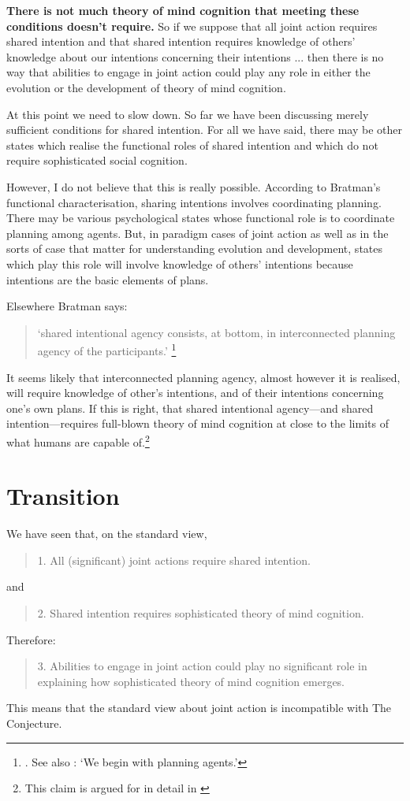 \documentclass[12pt,a4paper]{extarticle}
\begin{document}
\textbf{There is not much theory of mind cognition that meeting these conditions doesn't require.}  
So if we suppose that all joint action requires shared intention and that shared intention requires knowledge of others' knowledge about our intentions concerning their intentions ... then there is no way that abilities to engage in joint action could play any role in either the evolution or the development of theory of mind cognition.

At this point we need to slow down.
So far we have been discussing merely sufficient conditions for shared intention.
For all we have said, there may be other states which realise the functional roles of shared intention and which do not require sophisticated social cognition.

However, I do not believe that this is really possible. 
According to Bratman’s functional characterisation, sharing intentions involves coordinating planning.  
There may be various psychological states whose functional role is to coordinate planning among agents.  
But, in paradigm cases of joint action as well as in the sorts of case that matter for understanding evolution and development, states which play this role will involve knowledge of others’ intentions because intentions are the basic elements of plans. 

Elsewhere Bratman says:
%
\begin{quote}
`shared intentional agency consists, at bottom, in interconnected planning agency of the participants.'%
\footnote{
\citet[p.\ 11]{Bratman:2011fk}.
See also \citet[p.\ 5]{Bratman:2011fk}: `We begin with planning agents.'
}
\end{quote}
%
It seems likely that interconnected planning agency, almost however it is realised, will require knowledge of other's intentions, and of their intentions concerning one's own plans.
If this is right, that shared intentional agency---and shared intention---requires full-blown theory of mind cognition at close to the limits of what humans are capable of.\footnote{
This claim is argued for in detail in \citet{Butterfill:2011fk}
}



\section{Transition}
We have seen that, on the standard view, 
%
\begin{quote}
1. All (significant) joint actions require shared intention.
\end{quote}
%
and 
%
\begin{quote}
2. Shared intention requires sophisticated theory of mind cognition.
\end{quote}
%
Therefore:
%
\begin{quote}
3. Abilities to engage in joint action could play no significant role in explaining how sophisticated theory of mind cognition emerges.
\end{quote}
%
This means that the standard view about joint action is incompatible with The Conjecture.
\end{document}
